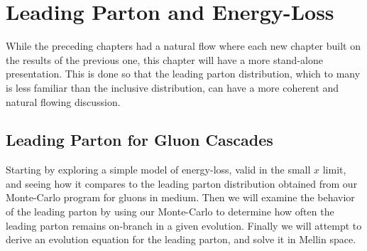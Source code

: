 \documentclass[main.tex]{subfiles}
\begin{document}
\chapter{Leading Parton and Energy-Loss}\label{cpt:leading}
While the preceding chapters had a natural flow where each new chapter built on the results of the previous one, this chapter will have a more stand-alone presentation. This is done so that the leading parton distribution, which to many is less familiar than the inclusive distribution, can have a more coherent and natural flowing discussion. 

\section{Leading Parton for Gluon Cascades}
Starting by exploring a simple model of energy-loss, valid in the small \(x\) limit, and seeing how it compares to the leading parton distribution obtained from our Monte-Carlo program for gluons in medium. Then we will examine the behavior of the leading parton by using our Monte-Carlo to determine how often the leading parton remains on-branch in a given evolution. Finally we will attempt to derive an evolution equation for the leading parton, and solve it in Mellin space. 
\end{document}
